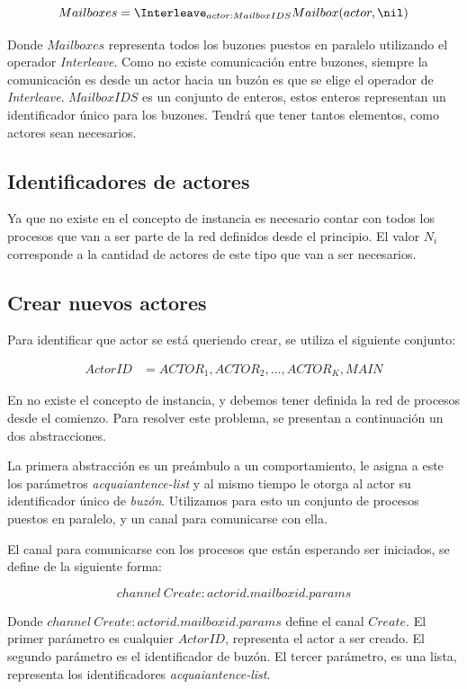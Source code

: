 \[
Mailboxes = \Interleave_{ actor : MailboxIDS } Mailbox(actor, \nil) 
\]

Donde $Mailboxes$ representa todos los buzones puestos en paralelo utilizando el operador \textit{Interleave}. Como no existe comunicación entre buzones, siempre la comunicación es desde un actor hacia un buzón es que se elige el operador de \textit{Interleave}. $MailboxIDS$ es un conjunto de enteros, estos enteros representan un identificador único para los buzones. Tendrá que tener tantos elementos, como actores sean necesarios.


\subsection{Identificadores de actores}\label{model:id}

Ya que no existe en \CSP el concepto de instancia es necesario contar con todos los procesos que van a ser parte de la red definidos desde el principio. El valor $N_i$ corresponde a la cantidad de actores de este tipo que van a ser necesarios. 


\subsection{Crear nuevos actores}\label{modelo:crear}

Para identificar que actor se está queriendo crear, se utiliza el siguiente conjunto: 

\begin{align*}
  ActorID &= { ACTOR_1, ACTOR_2, \ldots, ACTOR_K, MAIN }
\end{align*}

En \CSP no existe el concepto de instancia, y debemos tener definida la red de procesos desde el comienzo. Para resolver este problema, se presentan a continuación un dos abstracciones.

La primera abstracción es un preámbulo a un comportamiento, le asigna a este los parámetros \textit{acquaiantence-list} y al mismo tiempo le otorga al actor su identificador único de \textit{buzón}. Utilizamos para esto un conjunto de procesos puestos en paralelo, y un canal para comunicarse con ella.

El canal para comunicarse con los procesos que están esperando ser iniciados, se define de la siguiente forma:

\[
channel\ Create:actorid.mailboxid.params
\]

Donde $channel\ Create:actorid.mailboxid.params$ define el canal $Create$. El primer parámetro es cualquier $ActorID$, representa el actor a ser creado. El segundo parámetro es el identificador de buzón. El tercer parámetro, es una lista, representa los identificadores \textit{acquaiantence-list}. 

